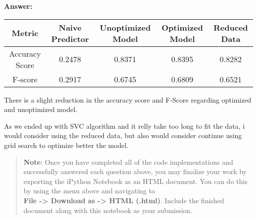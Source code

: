 \documentclass[11pt]{article}
\begin{document}
    \textbf{Answer:}

\begin{longtable}[]{@{}ccccc@{}}
\toprule
Metric & Naive Predictor & Unoptimized Model & Optimized Model & Reduced
Data\tabularnewline
\midrule
\endhead
Accuracy Score & 0.2478 & 0.8371 & 0.8395 & 0.8282\tabularnewline
F-score & 0.2917 & 0.6745 & 0.6809 & 0.6521\tabularnewline
\bottomrule
\end{longtable}

There is a slight reduction in the accuracy score and F-Score regarding
optimized and unoptimized model.

As we ended up with SVC algorithm and it relly take too long to fit the
data, i would consider using the reduced data, but also would consider
continue using grid search to optimize better the model.

    \begin{quote}
\textbf{Note}: Once you have completed all of the code implementations
and successfully answered each question above, you may finalize your
work by exporting the iPython Notebook as an HTML document. You can do
this by using the menu above and navigating to\\
\textbf{File -\textgreater{} Download as -\textgreater{} HTML (.html)}.
Include the finished document along with this notebook as your
submission.
\end{quote}


    
    
    
    
\end{document}
